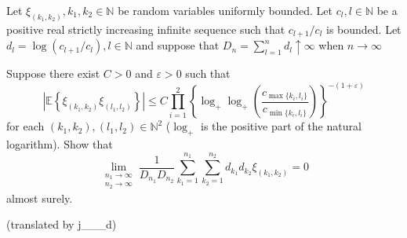 Let $\xi_{(k_1, k_2)}, k_1, k_2 \in\mathbb N$ be random variables uniformly bounded. Let $c_l, l\in\mathbb N$ be a positive real strictly increasing infinite sequence such that $c_{l+1}/ c_l$ is bounded. Let $d_l=\log \left(c_{l+1}/c_l\right), l\in\mathbb N$ and suppose that $D_n=\sum_{l=1}^n d_l\uparrow \infty$ when $n\to\infty$

Suppose there exist $C>0$ and $\varepsilon>0$ such that
$$\left| \mathbb E \left\{ \xi_{(k_1,k_2)}\xi_{(l_1,l_2)}\right\}\right| \leq C\prod_{i=1}^2 \left\{ \log_+\log_+\left( \frac{c_{\max\{ k_i, l_i\}}}{c_{\min\{ k_i, l_i\}}}\right)\right\}^{-(1+\varepsilon)}$$for each $(k_1, k_2), (l_1,l_2)\in\mathbb N^2$ ($\log_+$ is the positive part of the natural logarithm). Show that
$$\lim_{\substack{n_1\to\infty \\ n_2\to\infty}} \frac{1}{D_{n_1}D_{n_2}}\sum_{k_1=1}^{n_1} \sum_{k_2=1}^{n_2}  d_{k_1}d_{k_2}\xi_{(k_1,k_2)}=0$$almost surely.

(translated by j___d)